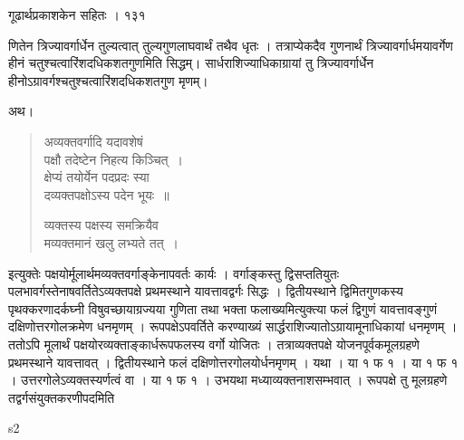 \documentclass[11pt, openany]{book}
\begin{document}

\newpage

\hspace{3cm}  गूढार्थप्रकाशकेन सहितः । \hfill १३१
\vspace{1cm}

\begin{sloppypar}
\noindent णितेन त्रिज्यावर्गार्धेन तुल्यत्वात् तुल्यगुणलाघवार्थं तथैव धृतः । तत्राप्येकदैव गुणनार्थं त्रिज्यावर्गार्धमयावर्गेण हीनं चतुश्चत्वारिंशदधिकशतगुणमिति सिद्धम्। सार्धराशिज्याधिकाग्रायां तु त्रिज्यावर्गार्धेन हीनोऽग्रावर्गश्चतुश्चत्वारिंशदधिकशतगुण मृणम्।
\end{sloppypar}


\noindent अथ। %
\begin{quote}
{\qt अव्यक्तवर्गादि यदावशेषं\\

पक्षौ तदेष्टेन निहत्य किञ्चित्~।\\
क्षेप्यं तयोर्येन पदप्रदः स्या\\
दव्यक्तपक्षोऽस्य पदेन भूयः~॥

व्यक्तस्य पक्षस्य समक्रियैव\\
मव्यक्तमानं खलु लभ्यते तत्~।}
\end{quote}
\begin{sloppypar}

इत्युक्तेः पक्षयोर्मूलार्थमव्यक्तवर्गाङ्केनापवर्तः कार्यः । वर्गाङ्कस्तु द्विसप्ततियुतः पलभावर्गस्तेनाषवर्तितेऽव्यक्तपक्षे प्रथमस्थाने यावत्तावद्वर्गः सिद्धः । द्वितीयस्थाने द्विमितगुणकस्य पृथक्करणादर्कघ्नी विषुवच्छायाग्रज्यया गुणिता तथा भक्ता फलाख्यमित्युक्त्या फलं द्विगुणं यावत्तावङ्गुणं दक्षिणोत्तरगोलक्रमेण धनमृणम् । रूपपक्षेऽपवर्तिते करण्याख्यं सार्द्धराशिज्यातोऽग्रायामूनाधिकायां धनमृणम् । ततोऽपि मूलार्थं पक्षयोरव्यक्ताङ्कार्धरूपफलस्य वर्गो योजितः । तत्राव्यक्तपक्षे योजनपूर्वकमूलग्रहणे प्रथमस्थाने यावत्तावत् । द्वितीयस्थाने फलं दक्षिणोत्तरगोलयोर्धनमृणम् । यथा । या १ फ १ । या १ फ १ । उत्तरगोलेऽव्यक्तस्यर्णत्वं वा । या १ फ १ । उभयथा मध्याव्यक्तनाशसम्भवात् । रूपपक्षे तु मूलग्रहणे तद्वर्गसंयुक्तकरणीपदमिति
\end{sloppypar}

 {\tiny{s2}}



\newpage
\end{document}
